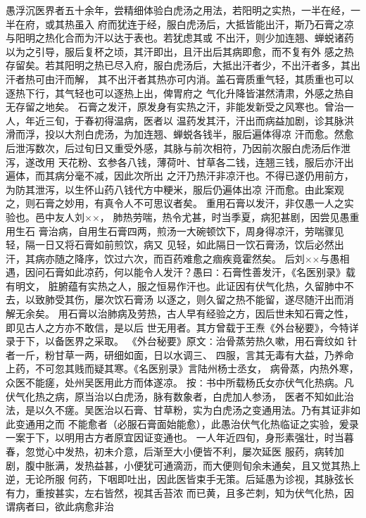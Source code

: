 \documentclass[a4paper,12pt,UTF8,twoside]{ctexbook}
\begin{document}
愚浮沉医界者五十余年，尝精细体验白虎汤之用法，若阳明之实热，一半在经，一半在府，或其热虽入 
府而犹连于经，服白虎汤后，大抵皆能出汗，斯乃石膏之凉与阳明之热化合而为汗以达于表也。若犹虑其或 
不出汗，则少加连翘、蝉蜕诸药以为之引导，服后复杯之顷，其汗即出，且汗出后其病即愈，而不复有外 
感之热存留矣。若其阳明之热已尽入府，服白虎汤后，大抵出汗者少，不出汗者多，其出汗者热可由汗而解， 
其不出汗者其热亦可内消。盖石膏质重气轻，其质重也可以逐热下行，其气轻也可以逐热上出，俾胃府之 
气化升降皆湛然清肃，外感之热自无存留之地矣。 
石膏之发汗，原发身有实热之汗，非能发新受之风寒也。曾治一人，年近三旬，于春初得温病，医者以 
温药发其汗，汗出而病益加剧，诊其脉洪滑而浮，投以大剂白虎汤，为加连翘、蝉蜕各钱半，服后遍体得凉 
汗而愈。然愈后泄泻数次，后过旬日又重受外感，其脉与前次相符，乃因前次服白虎汤后作泄泻，遂改用 
天花粉、玄参各八钱，薄荷叶、甘草各二钱，连翘三钱，服后亦汗出遍体，而其病分毫不减，因此次所出 
之汗乃热汗非凉汗也。不得已遂仍用前方，为防其泄泻，以生怀山药八钱代方中粳米，服后仍遍体出凉 
汗而愈。由此案观之，则石膏之妙用，有真令人不可思议者矣。 
重用石膏以发汗，非仅愚一人之实验也。邑中友人刘××， 
肺热劳喘，热令尤甚，时当季夏，病犯甚剧，因尝见愚重用生石 
膏治病，自用生石膏四两，煎汤一大碗顿饮下，周身得凉汗，劳喘骤见轻，隔一日又将石膏如前煎饮，病又 
见轻，如此隔日一饮石膏汤，饮后必然出汗，其病亦随之降序，饮过六次，而百药难愈之痼疾竟霍然矣。 
后刘××与愚相遇，因问石膏如此凉药，何以能令人发汗？愚曰∶石膏性善发汗，《名医别录》载有明文， 
脏腑蕴有实热之人，服之恒易作汗也。此证因有伏气化热，久留肺中不去，以致肺受其伤，屡次饮石膏汤 
以逐之，则久留之热不能留，遂尽随汗出而消解无余矣。 
用石膏以治肺病及劳热，古人早有经验之方，因后世未知石膏之性，即见古人之方亦不敢信，是以后 
世无用者。其方曾载于王焘《外台秘要》，今特详录于下，以备医界之采取。 
《外台秘要》原文∶治骨蒸劳热久嗽，用石膏纹如 针者一斤，粉甘草一两，研细如面，日以水调三、 
四服，言其无毒有大益，乃养命上药，不可忽其贱而疑其寒。《名医别录》言陆州杨士丞女， 
病骨蒸，内热外寒，众医不能瘥，处州吴医用此方而体遂凉。 
按∶书中所载杨氏女亦伏气化热病。凡伏气化热之病，原当治以白虎汤，脉有数象者，白虎加人参汤， 
医者不知如此治法，是以久不瘥。吴医治以石膏、甘草粉，实为白虎汤之变通用法。乃有其证非如此变通用之而 
不能愈者（必服石膏面始能愈），此愚治伏气化热临证之实验，爰录一案于下，以明用古方者原宜因证变通也。 
一人年近四旬，身形素强壮，时当暮春，忽觉心中发热，初未介意，后渐至大小便皆不利，屡次延医 
服药，病转加剧，腹中胀满，发热益甚，小便犹可通滴沥，而大便则旬余未通矣，且又觉其热上逆，无论所服 
何药，下咽即吐出，因此医皆束手无策。后延愚为诊视，其脉弦长有力，重按甚实，左右皆然，视其舌苔浓 
而已黄，且多芒刺，知为伏气化热，因谓病者曰，欲此病愈非治 
\end{document}
